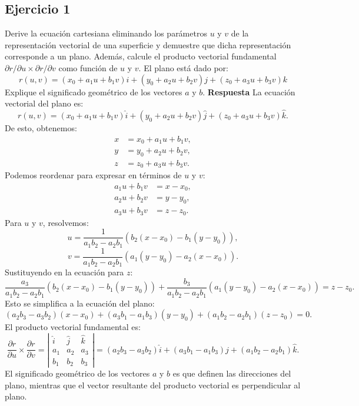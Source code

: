 \documentclass{report}
\begin{document}
\subsection*{Ejercicio 1}
Derive la ecuación cartesiana eliminando los parámetros \(u\) y \(v\) de la representación vectorial de una superficie y demuestre que dicha representación corresponde a un plano. Además, calcule el producto vectorial fundamental \(\partial r / \partial u \times \partial r / \partial v\) como función de \(u\) y \(v\).
El plano está dado por:
$$
r(u, v)=\left(x_0+a_1 u+b_1 v\right) i+\left(y_0+a_2 u+b_2 v\right) j+\left(z_0+a_3 u+b_3 v\right) k
$$
Explique el significado geométrico de los vectores \(a\) y \(b\).
\textbf{Respuesta}
La ecuación vectorial del plano es:
\[
r(u, v) = \left(x_0 + a_1 u + b_1 v \right) \hat{i} + \left(y_0 + a_2 u + b_2 v \right) \hat{j} + \left(z_0 + a_3 u + b_3 v \right) \hat{k}.
\]
De esto, obtenemos:
\[
\begin{aligned}
x &= x_0 + a_1 u + b_1 v, \\
y &= y_0 + a_2 u + b_2 v, \\
z &= z_0 + a_3 u + b_3 v.
\end{aligned}
\]
Podemos reordenar para expresar en términos de \(u\) y \(v\):
\[
\begin{aligned}
a_1 u + b_1 v &= x - x_0, \\
a_2 u + b_2 v &= y - y_0, \\
a_3 u + b_3 v &= z - z_0.
\end{aligned}
\]
Para \(u\) y \(v\), resolvemos:
\[
u = \frac{1}{a_1 b_2 - a_2 b_1} \left( b_2 (x - x_0) - b_1 (y - y_0) \right),
\]
\[
v = \frac{1}{a_1 b_2 - a_2 b_1} \left( a_1 (y - y_0) - a_2 (x - x_0) \right).
\]
Sustituyendo en la ecuación para \(z\):
\[
\frac{a_3}{a_1 b_2 - a_2 b_1} \left( b_2 (x - x_0) - b_1 (y - y_0) \right) + \frac{b_3}{a_1 b_2 - a_2 b_1} \left( a_1 (y - y_0) - a_2 (x - x_0) \right) = z - z_0.
\]
Esto se simplifica a la ecuación del plano:
\[
\left(a_2 b_3 - a_3 b_2\right) \left( x - x_0 \right) + \left( a_3 b_1 - a_1 b_3 \right) \left( y - y_0 \right) + \left( a_1 b_2 - a_2 b_1 \right) \left( z - z_0 \right) = 0.
\]
El producto vectorial fundamental es:
\[
\frac{\partial r}{\partial u} \times \frac{\partial r}{\partial v} = \left| \begin{array}{ccc}
\hat{i} & \hat{j} & \hat{k} \\
a_1 & a_2 & a_3 \\
b_1 & b_2 & b_3
\end{array} \right| = \left( a_2 b_3 - a_3 b_2 \right) \hat{i} + \left( a_3 b_1 - a_1 b_3 \right) \hat{j} + \left( a_1 b_2 - a_2 b_1 \right) \hat{k}.
\]
El significado geométrico de los vectores \(a\) y \(b\) es que definen las direcciones del plano, mientras que el vector resultante del producto vectorial es perpendicular al plano.
\end{document}
